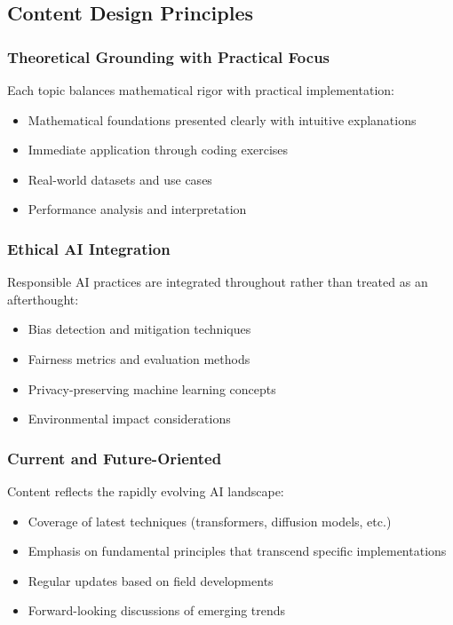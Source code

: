 \subsection{Content Design Principles}

\subsubsection{Theoretical Grounding with Practical Focus}

Each topic balances mathematical rigor with practical implementation:
\begin{itemize}
    \item Mathematical foundations presented clearly with intuitive explanations
    \item Immediate application through coding exercises
    \item Real-world datasets and use cases
    \item Performance analysis and interpretation
\end{itemize}

\subsubsection{Ethical AI Integration}

Responsible AI practices are integrated throughout rather than treated as an afterthought:
\begin{itemize}
    \item Bias detection and mitigation techniques
    \item Fairness metrics and evaluation methods
    \item Privacy-preserving machine learning concepts
    \item Environmental impact considerations
\end{itemize}

\subsubsection{Current and Future-Oriented}

Content reflects the rapidly evolving AI landscape:
\begin{itemize}
    \item Coverage of latest techniques (transformers, diffusion models, etc.)
    \item Emphasis on fundamental principles that transcend specific implementations
    \item Regular updates based on field developments
    \item Forward-looking discussions of emerging trends
\end{itemize}

